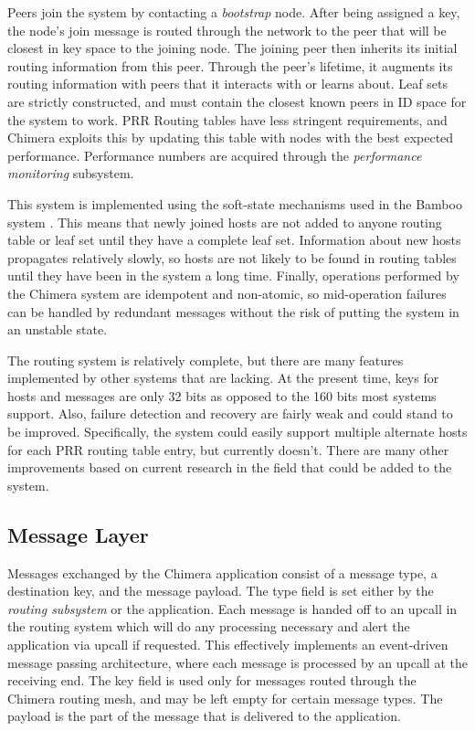 Peers join the system by contacting a {\em bootstrap} node. After being assigned
a key, the node's join message is routed through the network to the peer
that will be closest in key space to the joining node. The 
joining peer then inherits
its initial routing information from this peer. Through the peer's lifetime,
it augments its routing information with peers that it interacts with or
learns about. Leaf sets are strictly constructed,
and must contain the closest known
peers in ID space for the system to work. PRR Routing tables have less
stringent requirements, and Chimera exploits this by updating this table
with nodes with the best expected performance. Performance numbers are
acquired through the {\em performance monitoring} subsystem.

This system is implemented using the soft-state mechanisms used in the
Bamboo system \cite{bamboo-churn}. This means that newly joined hosts are not
added to anyone routing table or leaf set until they have a complete
leaf set. Information about new hosts propagates relatively slowly, so
hosts are not likely to be found in routing tables until they have
been in the system a long time. Finally, operations performed
by the Chimera system are idempotent and non-atomic, so 
mid-operation failures can be handled by redundant messages without the
risk of putting the system in an unstable state.

The routing system is relatively complete, but there are many features
implemented by other systems that are lacking.
At the present time, keys for hosts and messages
are only 32 bits as opposed to the 160 bits most systems support. Also,
failure detection and recovery are fairly weak and could stand to be
improved. Specifically, the system could easily support multiple
alternate hosts for each PRR routing table entry, but currently doesn't.
There are many other improvements based on current research in the field
that could be added to the system.

\subsection{Message Layer}
\label{message}

Messages exchanged by the Chimera application consist of a message type, a
destination key, and the message payload. The type field is set either by
the {\em routing subsystem} or the application. Each message is handed off to
an upcall in the routing system which will do any processing necessary
and alert the application via upcall if requested. This effectively implements
an event-driven message passing architecture, where each message is processed
by an upcall at the receiving end. The key field is used
only for messages routed through the Chimera routing mesh, and may be
left empty for certain message types. The payload is the part of the
message that is delivered to the application.

